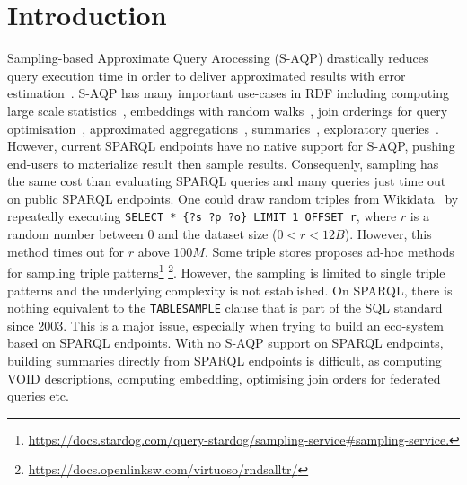 
\section{Introduction}

Sampling-based Approximate Query Arocessing (S-AQP) drastically reduces query
execution time in order to deliver approximated results with error
estimation~\cite{DBLP:conf/sigmod/AgarwalMKTJMMS14}. S-AQP has many important use-cases in RDF including
computing large scale
statistics~\cite{soulet2019anytime,10.1007/978-3-319-18818-8_14},
embeddings with random walks~\cite{ristoski2016rdf2vec}, join
orderings for query optimisation~\cite{DBLP:conf/cidr/LeisRGK017},
approximated
aggregations~\cite{DBLP:journals/tods/LiWYZ19,wang2022approximate},
summaries~\cite{10.1007/978-3-030-49461-2_10}, exploratory
queries~\cite{DBLP:conf/sigmod/AgarwalMKTJMMS14}.
%
However, current SPARQL endpoints have no native support for S-AQP,
pushing end-users to materialize result then sample
results. Consequenly, sampling has the same cost than evaluating
SPARQL queries and many queries just time out on public SPARQL
endpoints.
%
One could draw random triples from
Wikidata~\cite{soulet2019anytime} by repeatedly executing
\lstinline[language=SPARQL]|SELECT * {?s ?p ?o} LIMIT 1 OFFSET r|, where $r$ is a random
number between $0$ and the dataset size ($0<r<12B$). However, this
method times out for $r$ above $100M$. Some triple stores proposes
ad-hoc methods for sampling triple
patterns\footnote{\url{https://docs.stardog.com/query-stardog/sampling-service\#sampling-service.}}
\footnote{\url{https://docs.openlinksw.com/virtuoso/rndsalltr/}}.
However, the sampling is limited to single triple patterns and the
underlying complexity is not established.  On SPARQL, there is nothing
equivalent to the \texttt{TABLESAMPLE} clause that is part of the SQL
standard since 2003. This is a major issue, especially when trying to
build an eco-system based on SPARQL endpoints. With no S-AQP support
on SPARQL endpoints, building summaries directly from SPARQL endpoints
is difficult, as computing VOID descriptions, computing embedding,
optimising join orders for federated queries etc.


